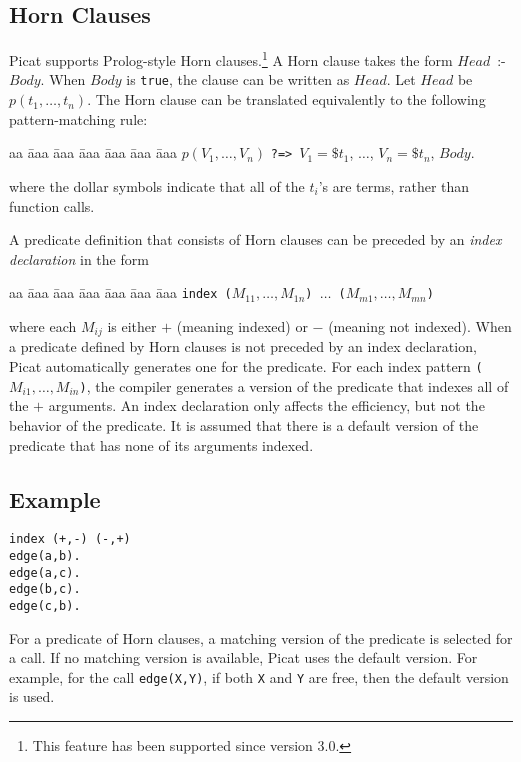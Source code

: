 \subsection*{\label{section:horn}Horn Clauses}
Picat supports Prolog-style Horn clauses.\footnote{This feature has been supported since version 3.0.} A Horn clause takes the form $Head$\ :-\ $Body$. When $Body$ is \texttt{true}, the clause can be written as $Head$. Let $Head$ be $p(t_1,\ldots,t_n)$. The Horn clause can be translated equivalently to the following pattern-matching rule:
\begin{tabbing}
aa \= aaa \= aaa \= aaa \= aaa \= aaa \= aaa \kill
\> $p(V_1,\ldots,V_n)$ \verb+?=>+\ $V_1 = \$t_1$, $\ldots$, $V_n = \$t_n$, $Body$.
\end{tabbing}
where the dollar symbols indicate that all of the $t_i$'s are terms, rather than function calls.

A predicate definition that consists of Horn clauses can be preceded by an \emph{index declaration} in the form
\begin{tabbing}
aa \= aaa \= aaa \= aaa \= aaa \= aaa \= aaa \kill
\> \texttt{index ($M_{11},\ldots,M_{1n}$) $\ldots$ ($M_{m1},\ldots,M_{mn}$)}
\end{tabbing}
where each $M_{ij}$ is either $+$ (meaning indexed) or $-$ (meaning not indexed). When a predicate defined by Horn clauses is not preceded by an index declaration, Picat automatically generates one for the predicate. For each index pattern \texttt{($M_{i1},\ldots,M_{in}$)}, the compiler generates a version of the predicate that indexes all of the $+$ arguments. An index declaration only affects the efficiency, but not the behavior of the predicate. It is assumed that there is a default version of the predicate that has none of its arguments indexed.


\subsection*{Example}
\begin{verbatim}
index (+,-) (-,+)
edge(a,b).
edge(a,c).
edge(b,c).
edge(c,b).
\end{verbatim}
For a predicate of Horn clauses, a matching version of the predicate is selected for a call. If no matching version is available, Picat uses the default version. For example, for the call \texttt{edge(X,Y)}, if both \texttt{X} and \texttt{Y} are free, then the default version is used.

